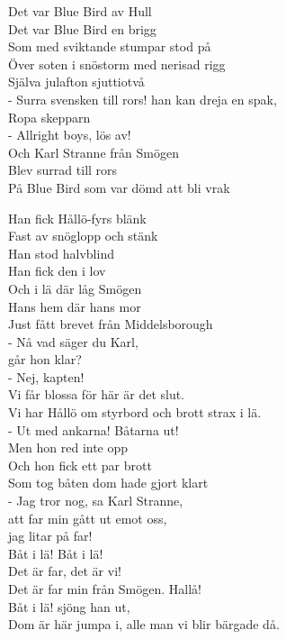 \vspace{10pt}
Det var Blue Bird av Hull\\
Det var Blue Bird en brigg\\
Som med sviktande stumpar stod på\\
Över soten i snöstorm med nerisad rigg\\
Själva julafton sjuttiotvå\\
- Surra svensken till rors! han kan dreja en spak,\\
Ropa skepparn\\
- Allright boys, lös av!\\
Och Karl Stranne från Smögen\\
Blev surrad till rors\\
På Blue Bird som var dömd att bli vrak\par
\vspace{10pt}
Han fick Hållö-fyrs blänk\\
Fast av snöglopp och stänk\\
Han stod halvblind\\
Han fick den i lov\\
Och i lä där låg Smögen\\
Hans hem där hans mor\\
Just fått brevet från Middelsborough\\
- Nå vad säger du Karl,\\
går hon klar?\\
- Nej, kapten!\\
Vi får blossa för här är det slut.\\
Vi har Hållö om styrbord och brott strax i lä.\\
- Ut med ankarna! Båtarna ut!\\
Men hon red inte opp\\
Och hon fick ett par brott\\
Som tog båten dom hade gjort klart\\
- Jag tror nog, sa Karl Stranne,\\
att far min gått ut emot oss,\\
jag litar på far!\\
Båt i lä! Båt i lä!\\
Det är far, det är vi!\\
Det är far min från Smögen. Hallå!\\
Båt i lä! sjöng han ut,\\
Dom är här jumpa i, alle man vi blir bärgade då.\par
